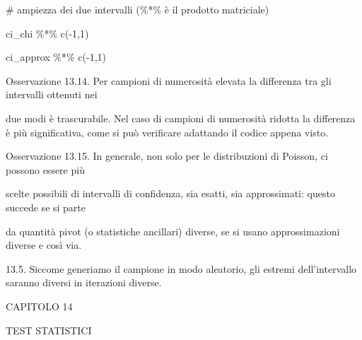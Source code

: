 \documentclass[a4paper,portrait,12pt]{article}
\begin{document}
\begin{flushleft}
\# ampiezza dei due intervalli (\%*\% \`{e} il prodotto matriciale)
\end{flushleft}


\begin{flushleft}
ci\_chi \%*\% c(-1,1)
\end{flushleft}


\begin{flushleft}
ci\_approx \%*\% c(-1,1)
\end{flushleft}


\begin{flushleft}
Osservazione 13.14. Per campioni di numerosit\`{a} elevata la differenza tra gli intervalli ottenuti nei
\end{flushleft}


\begin{flushleft}
due modi \`{e} trascurabile. Nel caso di campioni di numerosit\`{a} ridotta la differenza \`{e} più significativa, come si pu\`{o} verificare adattando il codice appena visto.
\end{flushleft}


\begin{flushleft}
Osservazione 13.15. In generale, non solo per le distribuzioni di Poisson, ci possono essere più
\end{flushleft}


\begin{flushleft}
scelte possibili di intervalli di confidenza, sia esatti, sia approssimati: questo succede se si parte
\end{flushleft}


\begin{flushleft}
da quantit\`{a} pivot (o statistiche ancillari) diverse, se si usano approssimazioni diverse e così via.
\end{flushleft}


\begin{flushleft}
13.5. Siccome generiamo il campione in modo aleatorio, gli estremi dell'intervallo saranno diversi in iterazioni diverse.
\end{flushleft}





\begin{flushleft}
\newpage
\newpage
CAPITOLO 14
\end{flushleft}


\begin{flushleft}
TEST STATISTICI
\end{flushleft}
\end{document}
